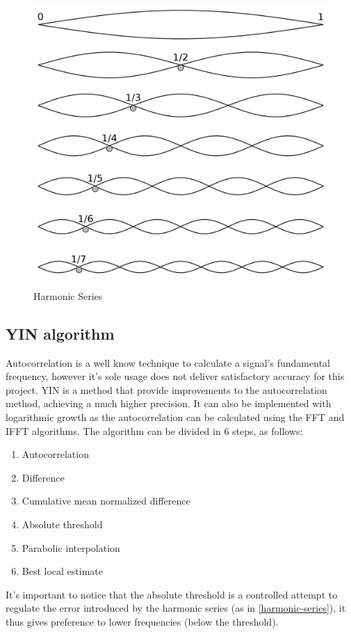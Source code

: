\begin{figure}[htb]
	\caption{Harmonic Series}
  \label{harmonic-series}
	\begin{center}
    \includegraphics[scale=0.15]{images/harmonic-series}
	\end{center}
\end{figure}

\subsection{YIN algorithm}
Autocorrelation is a well know technique to calculate a signal's fundamental
frequency, however it's sole usage does not deliver satisfactory accuracy for this project.
YIN \cite{YINArticle} is a method that provide improvements to the autocorrelation method, achieving
a much higher precision. It can also be implemented with logarithmic growth as the
autocorrelation can be calculated using the FFT and IFFT algorithms. The algorithm
can be divided in 6 steps, as follows:
\begin{enumerate}
  \item Autocorrelation
  \item Difference
  \item Cumulative mean normalized difference
  \item Absolute threshold
  \item Parabolic interpolation
  \item Best local estimate
\end{enumerate}
It's important to notice that the absolute threshold is a controlled attempt to regulate
the error introduced by the harmonic series (as in \autoref{harmonic-series}),
it thus gives preference to lower frequencies (below the threshold).

